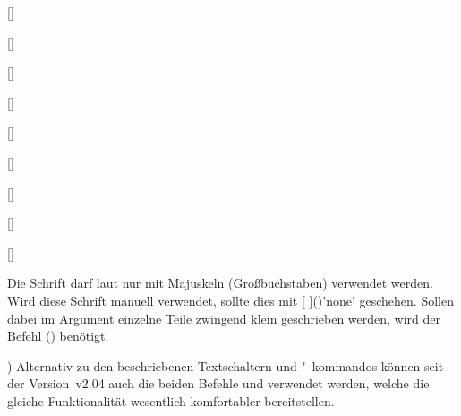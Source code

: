 \begin{Declaration*}{}
\begin{Declaration*}{}
\begin{Declaration*}{}
\begin{Declaration}{}
\begin{Declaration}{[]}
\begin{Declaration}{}
\begin{Declaration}{[]}
\begin{Declaration}{}
\begin{Declaration}{[]}
\begin{Declaration}{}
\begin{Declaration}{[]}
\begin{Declaration}{}
\begin{Declaration}{[]}
\begin{Declaration}{}
\begin{Declaration}{[]}
\begin{Declaration}{}
\begin{Declaration}{[]}
\begin{Declaration}{}
\begin{Declaration}{[]}
\begin{Declaration}{}
\begin{Declaration}{[]}
\begin{minipage}{-\tempdim}
\begin{tabularm}{3}
{      Die Schrift \DIN darf laut \CD nur mit Majuskeln (Großbuchstaben) 
      verwendet werden. Wird diese Schrift manuell verwendet, sollte dies mit 
      [%
      ]()'none' geschehen. Sollen dabei im Argument einzelne 
      Teile zwingend klein geschrieben werden, wird der Befehl 
      () benötigt.
    }
  \end{tabularm}%
  \end{minipage}%
)%
Alternativ zu den beschriebenen Textschaltern und "~kommandos können seit der 
Version~v2.04 auch die beiden Befehle  und  
verwendet werden, welche die gleiche Funktionalität wesentlich komfortabler 
bereitstellen.
\end{Declaration}
\end{Declaration}
\end{Declaration}
\end{Declaration}
\end{Declaration}
\end{Declaration}
\end{Declaration}
\end{Declaration}
\end{Declaration}
\end{Declaration}
\end{Declaration}
\end{Declaration}
\end{Declaration}
\end{Declaration}
\end{Declaration}
\end{Declaration}
\end{Declaration}
\end{Declaration}



\end{Declaration*}
\end{Declaration*}
\end{Declaration*}
